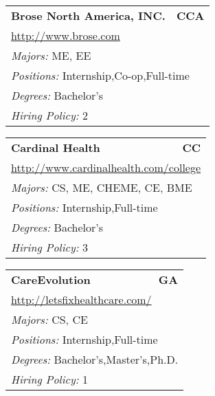 \documentclass[twoside]{article}
\begin{document}
\begin{center}
\begin{multicols}{3}
\begin{FlushLeft}
\begin{minipage}{.9\columnwidth}
\end{minipage}
 
\begin{minipage}{.9\columnwidth}\begin{tabularx}{.95\columnwidth}{Xr}
                 {\Large\bf Brose North America, INC.} & {\Large\bf CCA}\\
    \multicolumn{2}{p{.95\columnwidth}}{\url{http://www.brose.com}}\\
    \multicolumn{2}{p{.95\columnwidth}}{\emph{Majors:} ME, EE}\\
    \multicolumn{2}{p{.95\columnwidth}}{\emph{Positions:} Internship,Co-op,Full-time}\\
    \multicolumn{2}{p{.95\columnwidth}}{\emph{Degrees:} Bachelor's}\\
    \multicolumn{2}{p{.95\columnwidth}}{\emph{Hiring Policy:} 2}\\
    \end{tabularx}
    
\end{minipage}
 
\begin{minipage}{.9\columnwidth}\begin{tabularx}{.95\columnwidth}{Xr}
                 {\Large\bf Cardinal Health} & {\Large\bf CC}\\
    \multicolumn{2}{p{.95\columnwidth}}{\url{http://www.cardinalhealth.com/college}}\\
    \multicolumn{2}{p{.95\columnwidth}}{\emph{Majors:} CS, ME, CHEME, CE, BME}\\
    \multicolumn{2}{p{.95\columnwidth}}{\emph{Positions:} Internship,Full-time}\\
    \multicolumn{2}{p{.95\columnwidth}}{\emph{Degrees:} Bachelor's}\\
    \multicolumn{2}{p{.95\columnwidth}}{\emph{Hiring Policy:} 3}\\
    \end{tabularx}
    
\end{minipage}
 
\begin{minipage}{.9\columnwidth}\begin{tabularx}{.95\columnwidth}{Xr}
                 {\Large\bf CareEvolution} & {\Large\bf GA}\\
    \multicolumn{2}{p{.95\columnwidth}}{\url{http://letsfixhealthcare.com/}}\\
    \multicolumn{2}{p{.95\columnwidth}}{\emph{Majors:} CS, CE}\\
    \multicolumn{2}{p{.95\columnwidth}}{\emph{Positions:} Internship,Full-time}\\
    \multicolumn{2}{p{.95\columnwidth}}{\emph{Degrees:} Bachelor's,Master's,Ph.D.}\\
    \multicolumn{2}{p{.95\columnwidth}}{\emph{Hiring Policy:} 1}\\
    \end{tabularx}
    

\end{minipage}
\end{FlushLeft}
\end{multicols}
\end{center}
\end{document}
